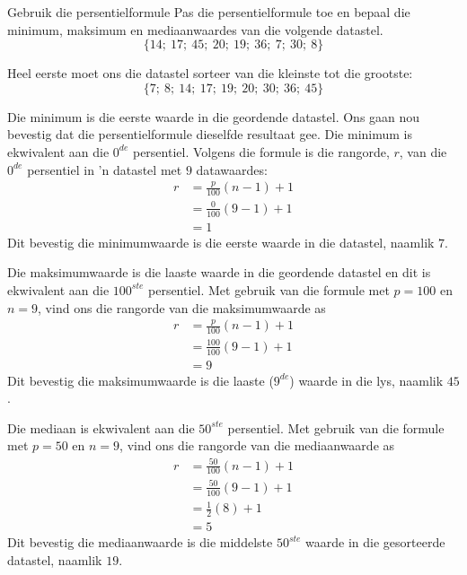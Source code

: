 \begin{wex}{Gebruik die persentielformule}
{Pas die persentielformule toe en bepaal die minimum, maksimum en mediaanwaardes van die volgende datastel. 
    \begin{equation*}
      \{14;\ 17;\ 45;\ 20;\ 19;\ 36;\ 7;\ 30;\ 8\}
    \end{equation*}
}{

  Heel eerste moet ons die datastel sorteer van die kleinste tot die grootste:
    \begin{equation*}
      \{7;\ 8;\ 14;\ 17;\ 19;\ 20;\ 30;\ 36;\ 45\}
    \end{equation*}


    Die minimum is die eerste waarde in die geordende datastel. Ons gaan nou bevestig dat die persentielformule dieselfde resultaat gee. Die minimum is ekwivalent aan die $0^{de}$ persentiel. Volgens die formule is die rangorde, $r$, van die $0^{de}$ persentiel in ’n datastel met $9$ datawaardes:
    \begin{align*}
      r &= \frac{p}{100}\left(n-1\right)+1 \\
        &= \frac{0}{100}\left(9-1\right)+1 \\
        &= 1
    \end{align*}
    Dit bevestig die minimumwaarde is die eerste waarde in die datastel, naamlik $7$.


    Die maksimumwaarde is die laaste waarde in die geordende datastel en dit is ekwivalent aan die $100^{ste}$
    persentiel. Met gebruik van die formule met $p=100$ en $n=9$,
     vind ons die rangorde van die maksimumwaarde as
    \begin{align*}
      r &= \frac{p}{100}\left(n-1\right)+1 \\
        &= \frac{100}{100}\left(9-1\right)+1 \\
        &= 9
    \end{align*}
    Dit bevestig die maksimumwaarde is die laaste ($9^{de}$) waarde in die lys, naamlik $45$.


    Die mediaan is ekwivalent aan die $50^{ste}$ persentiel. Met gebruik van die formule met $p=50$ en $n=9$, vind ons die rangorde van die mediaanwaarde as
    \begin{align*}
      r &= \frac{50}{100}\left(n-1\right)+1 \\
        &= \frac{50}{100}\left(9-1\right)+1 \\
        &= \frac{1}{2}(8)+1 \\
        &= 5
    \end{align*}
    Dit bevestig die mediaanwaarde is die middelste $50^{ste}$ waarde in die gesorteerde datastel, naamlik $19$. 
}
\end{wex}

